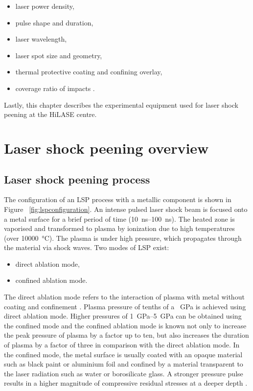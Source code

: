 \begin{itemize}
    
    \item laser power density,
    \item pulse shape and duration,
    \item laser wavelength,
    \item laser spot size and geometry,
    \item thermal protective coating and confining overlay,
    \item coverage ratio of impacts \cite{dane_2000}.

\end{itemize}

 Lastly, this chapter describes the experimental equipment used for laser shock peening at the HiLASE centre. 


\section{Laser shock peening overview}

\subsection{Laser shock peening process}
The configuration of an LSP process with a metallic component is shown in Figure~ \ref{fig:lspconfiguration}. An intense pulsed laser shock beam is focused onto a metal surface for a brief period of time (\SIrange{10}{100}{\ns}). The heated zone is vaporised and transformed to plasma by ionization due to high temperatures (over \SI{10000}{\degreeCelsius}). The plasma is under high pressure, which propagates through the material via shock waves. Two modes of LSP exist: 

\begin{itemize}

    \item direct ablation mode,
    \item confined ablation mode.

\end{itemize}

The direct ablation mode refers to the interaction of plasma with metal without coating and confinement \cite{sano}. Plasma pressure of tenths of a \SI{}{\GPa} is achieved using direct ablation mode. Higher pressures of \SIrange{1}{5}{\GPa} can be obtained using the confined mode and the confined ablation mode is known not only to increase the peak pressure of plasma by a factor up to ten, but also increases the duration of plasma by a factor of three in comparison with the direct ablation mode. In the confined mode, the metal surface is usually coated with an opaque material such as black paint or aluminium foil and confined by a material transparent to the laser radiation such as water or borosilicate glass. A stronger pressure pulse results in a higher magnitude of compressive residual stresses at a deeper depth \cite{fairland}. 

